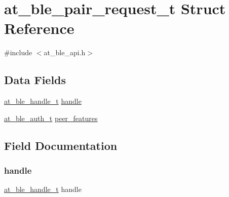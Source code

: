\hypertarget{structat__ble__pair__request__t}{}\section{at\+\_\+ble\+\_\+pair\+\_\+request\+\_\+t Struct Reference}
\label{structat__ble__pair__request__t}


{\ttfamily \#include $<$at\+\_\+ble\+\_\+api.\+h$>$}

\subsection*{Data Fields}
\begin{DoxyCompactItemize}
\item 
\mbox{\hyperlink{at__ble__api_8h_abd23646d0c662860741f787efc8456f2}{at\+\_\+ble\+\_\+handle\+\_\+t}} \mbox{\hyperlink{structat__ble__pair__request__t_ab8b0f353cb6a8d85f0822900e3b7cf35}{handle}}
\item 
\mbox{\hyperlink{at__ble__api_8h_a70253ec09a2361d16e15c37f8cb5b97c}{at\+\_\+ble\+\_\+auth\+\_\+t}} \mbox{\hyperlink{structat__ble__pair__request__t_afaa310cdb9a5c09f3a26241a5e9c2922}{peer\+\_\+features}}
\end{DoxyCompactItemize}


\subsection{Field Documentation}
\mbox{\label{structat__ble__pair__request__t_ab8b0f353cb6a8d85f0822900e3b7cf35}} 
\subsubsection{\texorpdfstring{handle}{handle}}
{\footnotesize\ttfamily \mbox{\hyperlink{at__ble__api_8h_abd23646d0c662860741f787efc8456f2}{at\+\_\+ble\+\_\+handle\+\_\+t}} handle}

\mbox{\label{structat__ble__pair__request__t_afaa310cdb9a5c09f3a26241a5e9c2922}} 
